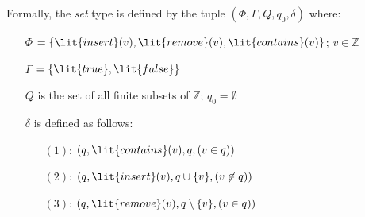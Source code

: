 \documentclass[11pt,pdftex,letterpaper]{article}
\newcommand{\true}{\lit{true}}
\newcommand{\false}{\lit{false}}
\begin{document}
Formally, the \emph{set} type is defined by the tuple $(\Phi,\Gamma, Q, q_0, \delta)$ where:
\begin{enumerate}
\item[$\Phi$] $=\{\lit{insert}(v), \lit{remove}(v), \lit{contains}(v) \}$; $v \in \mathbb{Z}$ 
\item[$\Gamma$] $=\{\true,\false\}$ 
\item[$Q$] is the set of all finite subsets of $\mathbb{Z}$; $q_0=\emptyset$
\item[$\delta$] is defined as follows:
\begin{enumerate}
\item[$(1)$:]
$(q,\lit{contains}(v),q,(v\in q))$
\item[$(2)$:]
$(q,\lit{insert}(v),q \cup \{v\},(v \not\in q))$
\item[$(3)$:]
$(q,\lit{remove}(v),q \setminus \{v\},(v \in q))$
\end{enumerate}
\end{enumerate}
\end{document}
